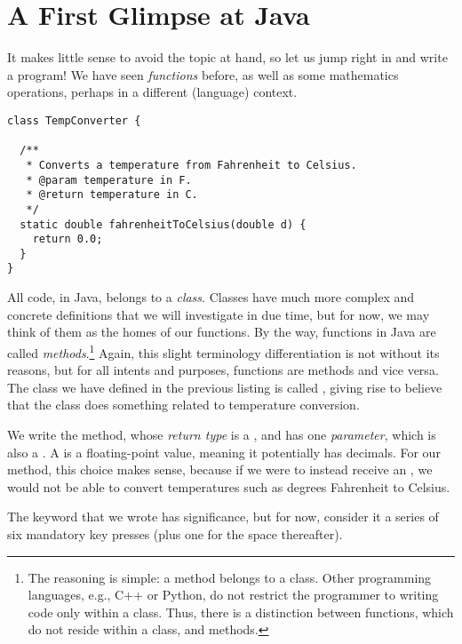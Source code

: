 \section{A First Glimpse at Java}
It makes little sense to avoid the topic at hand, so let us jump right in and write a program! We have seen \textit{functions} before, as well as some mathematics operations, perhaps in a different (language) context. 


\begin{cl}{}
\begin{lstlisting}[language=MyJava]
class TempConverter {
  
  /**
   * Converts a temperature from Fahrenheit to Celsius.
   * @param temperature in F.
   * @return temperature in C.
   */
  static double fahrenheitToCelsius(double d) {
    return 0.0;
  }
}
\end{lstlisting}
\end{cl}

All code, in Java, belongs to a \textit{class}. Classes have much more complex and concrete definitions that we will investigate in due time, but for now, we may think of them as the homes of our functions. By the way, functions in Java are called \textit{methods}.\footnote{The reasoning is simple: a method belongs to a class. Other programming languages, e.g., C++ or Python, do not restrict the programmer to writing code only within a class. Thus, there is a distinction between functions, which do not reside within a class, and methods.} Again, this slight terminology differentiation is not without its reasons, but for all intents and purposes, functions are methods and vice versa. The class we have defined in the previous listing is called , giving rise to believe that the class does something related to temperature conversion.

We write the  method, whose \textit{return type} is a , and has one \textit{parameter}, which is also a . A  is a floating-point value, meaning it potentially has decimals. For our method, this choice makes sense, because if we were to instead receive an , we would not be able to convert temperatures such as  degrees Fahrenheit to Celsius. 

The  keyword that we wrote has significance, but for now, consider it a series of six mandatory key presses (plus one for the space thereafter).

